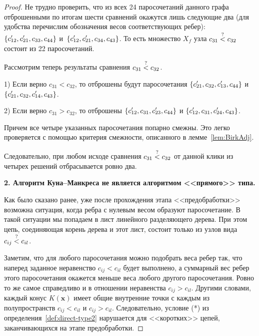 \begin{proof}
	Не трудно проверить, что из всех 24 паросочетаний данного графа
	отброшенными по итогам шести сравнений окажутся лишь следующие два
	(для удобства перечислим обозначения весов соответствующих ребер):
	$\{\cs_{12}, \cs_{21}, c_{33}, c_{44}\}$
	и~$\{\cs_{12}, \cs_{21}, c_{34}, c_{43}\}$.
	То есть множество $X_f$ узла $c_{31} \stackrel{?}{<} c_{32}$ состоит из 22 паросочетаний.
	
	Рассмотрим теперь результаты сравнения $c_{31} \stackrel{?}{<} c_{32}$.
	
	1) Если верно $c_{31} < c_{32}$, то отброшены будут 
	паросочетания $\{\cs_{21}, c_{32}, \cs_{13}, c_{44}\}$ 
	и $\{\cs_{21}, c_{32}, \cs_{14}, c_{43}\}$.
	
	2) Если верно $c_{31} > c_{32}$, то отброшены 
	$\{\cs_{12}, c_{31}, \cs_{23}, c_{44}\}$ 
	и $\{\cs_{12}, c_{31}, \cs_{24}, c_{43}\}$.
	
	Причем все четыре указанных паросочетания попарно смежны.
	Это легко проверяется с помощью критерия смежности, описанного в лемме~\ref{lem:BirkAdj}.
	
	
	Следовательно, при любом исходе сравнения $c_{31} \stackrel{?}{<} c_{32}$
	от данной клики из четырех решений отбрасывается ровно два.
	
	\textbf{2. Алгоритм Куна--Манкреса не является алгоритмом <<прямого>> типа.}
	
	Как было сказано ранее, уже после прохождения этапа <<предобработки>> возможна ситуация, 
	когда ребра с нулевым весом образуют паросочетание.
	В такой ситуации мы попадаем в лист линейного разделяющего дерева.
	При этом цепь, соединяющая корень дерева и этот лист,
	состоит только из узлов вида $c_{ij} \stackrel{?}{<} c_{il}$.
	
	Заметим, что для любого паросочетания можно подобрать веса ребер так,
	что наперед заданное неравенство $c_{ij} < c_{il}$ будет выполнено, 
	а суммарный вес ребер этого паросочетания
	окажется меньше веса любого другого паросочетания.
	Ровно то же самое справедливо и в отношении неравенства $c_{ij} > c_{il}$.
	Другими словами, каждый конус $K(\bm{x})$ имеет общие внутренние точки с каждым из полупространств $c_{ij} < c_{il}$ и $c_{ij} > c_{il}$.
	Следовательно, условие (*) из определения~\ref{def:direct-type2} нарушается
	для <<коротких>> цепей, заканчивающихся на этапе предобработки.
\end{proof}

